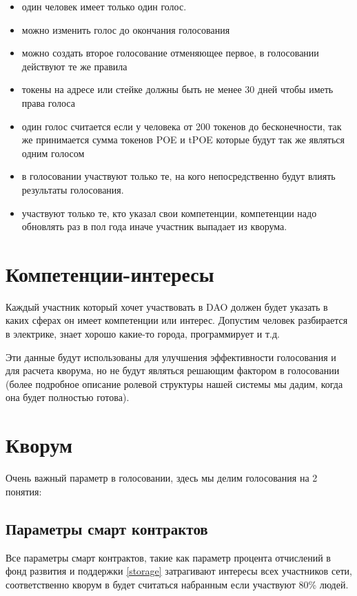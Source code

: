 \documentclass[a4paper,12pt]{report}
\begin{document}
\begin{itemize}
	\item один человек имеет только один голос.
	\item можно изменить голос до окончания голосования
	\item можно создать второе голосование отменяющее первое, в голосовании действуют те же правила
	\item токены на адресе или стейке должны быть не менее 30 дней чтобы иметь права голоса
	\item один голос считается если у человека от 200 токенов до бесконечности, так же принимается сумма токенов POE и tPOE которые будут так же являться одним голосом
	\item в голосовании участвуют только те, на кого непосредственно будут влиять результаты голосования.
	\item участвуют только те, кто указал свои компетенции, компетенции надо обновлять раз в пол года иначе участник выпадает из кворума.
	
\end{itemize}


\section{Компетенции-интересы}
Каждый участник который хочет участвовать в DAO должен будет указать в каких сферах он имеет компетенции или интерес. Допустим человек разбирается в электрике, знает хорошо какие-то города, программирует и т.д.

Эти данные будут использованы для улучшения эффективности голосования и для расчета кворума, но не будут являться решающим фактором в голосовании (более подробное описание ролевой структуры нашей системы мы дадим, когда она будет полностью готова).

\section{Кворум}
	
Очень важный параметр в голосовании, здесь мы делим голосования на 2 понятия:

\subsection{Параметры смарт контрактов}
Все параметры смарт контрактов, такие как параметр процента отчислений в фонд развития и поддержки \ref{storage} затрагивают интересы всех участников сети, соответственно кворум в будет считаться набранным если участвуют 80\% людей. 
\end{document}
